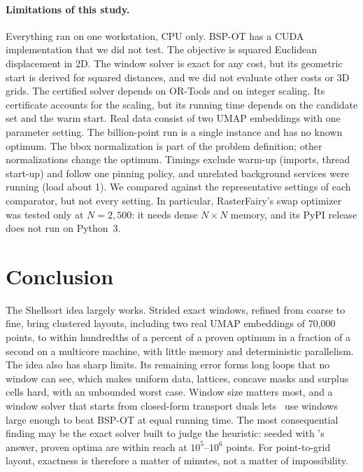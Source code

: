 \paragraph{Limitations of this study.} Everything ran on one workstation, CPU only.
BSP-OT has a CUDA implementation that we did not test. The objective is squared
Euclidean displacement in 2D. The window solver is exact for any cost, but its geometric
start is derived for squared distances, and we did not evaluate other costs or 3D grids. The certified solver depends on OR-Tools and on
integer scaling. Its certificate accounts for the scaling, but its running time depends
on the candidate set and the warm start. Real data consist of two UMAP embeddings with
one parameter setting. The billion-point run is a single instance
and has no known optimum. The bbox normalization is part of the problem definition; other
normalizations change the optimum. Timings exclude warm-up (imports, thread start-up) and follow one
pinning policy, and unrelated background services were running (load about 1). We
compared against the representative settings of each comparator, but not every setting.
In particular, RasterFairy's swap optimizer was tested only at $N=2{,}500$: it needs dense
$N\times N$ memory, and its PyPI release does not run on Python~3.

\section{Conclusion}
\label{sec:conclusion}

The Shellsort idea largely works. Strided exact windows,
refined from coarse to fine, bring clustered layouts, including two real UMAP embeddings
of 70{,}000 points, to within hundredths of a percent of a proven optimum in a
fraction of a second on a multicore machine, with little memory and deterministic parallelism. The idea also has sharp
limits. Its remaining error forms long loops that no window can see, which makes uniform
data, lattices, concave masks and surplus cells hard, with an unbounded worst case. Window
size matters most, and a window solver that starts from closed-form transport duals lets
\ShuffleSnap\ use windows large enough to beat BSP-OT at equal running time. The most consequential finding may be the
exact solver built to judge
the heuristic: seeded with \ShuffleSnap's answer, proven optima are within reach at
$10^5$--$10^6$ points. For point-to-grid layout, exactness is therefore a matter of
minutes, not a matter of impossibility.

